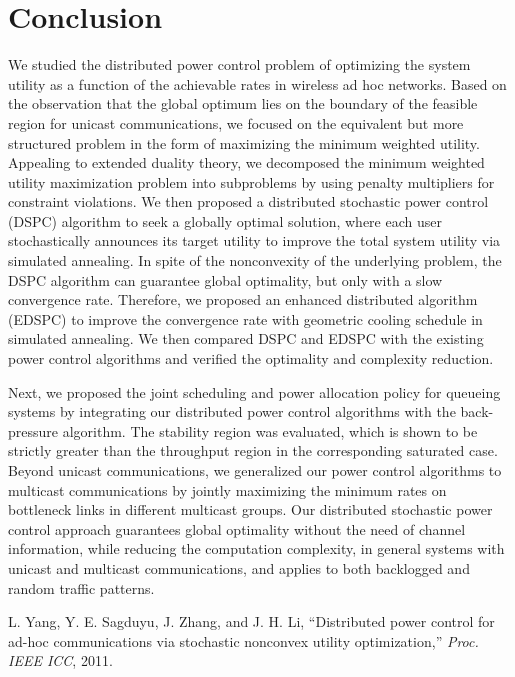 \documentclass[10pt,journal,letterpaper,compsoc]{IEEEtran}
\begin{document}
{{\section{Conclusion} \label{sec:conclusion}
We studied the distributed power control problem of optimizing the system utility as a function of the achievable rates in wireless ad hoc networks. Based on the observation that the global optimum lies on the boundary of the feasible region for unicast communications, we focused on the equivalent but more structured problem in the form of maximizing the minimum weighted utility. Appealing to extended duality theory, we decomposed the minimum weighted utility maximization problem into subproblems by using penalty multipliers for constraint violations. We then proposed a distributed stochastic power control (DSPC) algorithm to seek a globally optimal solution, where each user stochastically announces its target utility to improve the total system utility via simulated annealing. In spite of the nonconvexity of the underlying problem, the DSPC algorithm can guarantee global optimality, but only with a slow convergence rate. Therefore, we proposed an enhanced distributed algorithm (EDSPC) to improve the convergence rate with geometric cooling schedule in simulated annealing. We then compared DSPC and EDSPC with the existing power control algorithms and verified the optimality and complexity reduction.

Next, we proposed the joint scheduling and power allocation policy for queueing systems by integrating our distributed power control algorithms with the back-pressure algorithm. The stability region was evaluated, which is shown to be strictly greater than the throughput region in the corresponding saturated case. Beyond unicast communications, we generalized our power control algorithms to multicast communications by jointly maximizing the minimum rates on bottleneck links in different multicast groups. Our distributed stochastic power control approach guarantees global optimality  without the need of channel information, while reducing the computation complexity, in general systems with unicast and multicast communications, and applies to both backlogged and random traffic patterns.

\begin{thebibliography}{10}

L. Yang, Y. E. Sagduyu, J. Zhang, and J. H. Li, ``Distributed power control for ad-hoc communications via stochastic nonconvex utility optimization,'' \emph{Proc. IEEE ICC}, 2011.


\end{thebibliography}}}
\end{document}
